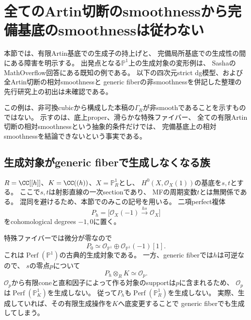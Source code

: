 \section{全てのArtin切断のsmoothnessから完備基底のsmoothnessは従わない}
\label{as:sec:obstruction}

本節では、有限Artin基底での生成子の持上げと、
完備局所基底での生成性の間にある障害を明示する。
出発点となる$\mathbb P^1$上の生成対象の変形例は、
SashaのMathOverflow回答\cite{AMSasha}にある既知の例である。
以下の四次元strict dg模型、および全Artin切断の相対smoothnessと
generic fiberの非smoothnessを併記した整理の先行研究上の初出は未確認である。

この例は、非可換cubicから構成した本稿の$\Gamma_R$が非smoothであることを示すものではない。
示すのは、底上proper、滑らかな特殊ファイバー、
全ての有限Artin切断の相対smoothnessという抽象的条件だけでは、
完備基底上の相対smoothnessを結論できないという事実である。

\subsection{生成対象がgeneric fiberで生成しなくなる族}

$R=\CC[[h]]$、$K=\CC((h))$、$X=\mathbb P^1_R$とし、
$H^0(X,\mathcal O_X(1))$の基底を$s,t$とする。
ここで$s,t$は射影直線の一次sectionであり、
MFの周期変数$t$とは無関係である。
混同を避けるため、本節でのみこの記号を用いる。
二項perfect複体
\begin{equation}\label{as:eq:P}
 P_h=\bigl[\mathcal O_X(-1)\xrightarrow{\,hs\,}\mathcal O_X\bigr]
\end{equation}
をcohomological degrees $-1,0$に置く。

特殊ファイバーでは微分が零なので
\[
 P_0\simeq\mathcal O_{\mathbb P^1}\oplus
                  \mathcal O_{\mathbb P^1}(-1)[1].
\]
これは$\operatorname{Perf}(\mathbb P^1)$の古典的生成対象である。
一方、generic fiberでは$h$は可逆なので、
$s$の零点$p$について
\[
 P_h\otimes_R K\simeq\mathcal O_p.
\]
$\mathcal O_p$から有限coneと直和因子によって作る対象のsupportは$p$に含まれるため、
$\mathcal O_p$は$\operatorname{Perf}(\mathbb P^1_K)$を生成しない。
従って$P_h$も$\operatorname{Perf}(\mathbb P^1_R)$を生成しない。
実際、生成していれば、その有限生成操作を$K$へ底変更することで
generic fiberでも生成してしまう。

